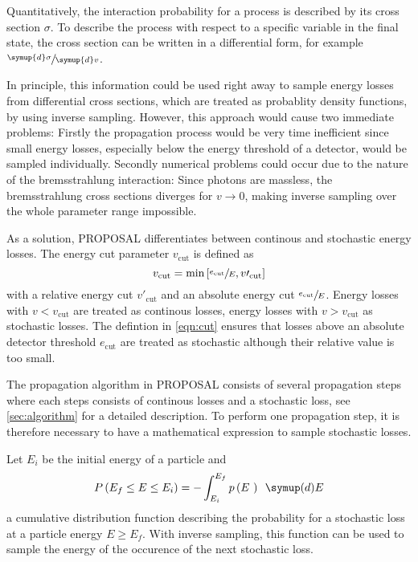 Quantitatively, the interaction probability for a process is described by its cross section $\sigma$.
To describe the process with respect to a specific variable in the final state, the cross section can be written in a differential form, for example $\sfrac{\symup{d}\sigma}{\symup{d}v}$.

In principle, this information could be used right away to sample energy losses from differential cross sections, which are treated as probablity density functions, by using inverse sampling.
However, this approach would cause two immediate problems:
Firstly the propagation process would be very time inefficient since small energy losses, especially below the energy threshold of a detector, would be sampled individually.
Secondly numerical problems could occur due to the nature of the bremsstrahlung interaction:
Since photons are massless, the bremsstrahlung cross sections diverges for $v \to 0$, making inverse sampling over the whole parameter range impossible.

As a solution, PROPOSAL differentiates between continous and stochastic energy losses.
The energy cut parameter $v_\text{cut}$ is defined as
\begin{equation}
	\label{eqn:cut}
	v_\text{cut} = \text{min}\left[\sfrac{e_\text{cut}}{E}, v\prime_\text{cut} \right]
\end{equation}
with a relative energy cut $v\prime_\text{cut}$ and an absolute energy cut $\sfrac{e_\text{cut}}{E}$.
Energy losses with $v < v_\text{cut}$ are treated as continous losses, energy losses with $v > v_\text{cut}$ as stochastic losses.
The defintion in \ref{eqn:cut} ensures that losses above an absolute detector threshold $e_\text{cut}$ are treated as stochastic although their relative value is too small.

The propagation algorithm in PROPOSAL consists of several propagation steps where each steps consists of continous losses and a stochastic loss, see \ref{sec:algorithm} for a detailed description.
To perform one propagation step, it is therefore necessary to have a mathematical expression to sample stochastic losses.

Let $E_i$ be the initial energy of a particle and
\begin{equation}
	\label{eqn:cum}
	P\left(E_f \leq E \leq E_i\right) = - \int_{E_i}^{E_f} p\left(E \right) \, \symup(d)E
\end{equation}
a cumulative distribution function describing the probability for a stochastic loss at a particle energy $E \geq E_f$.
With inverse sampling, this function can be used to sample the energy of the occurence of the next stochastic loss.

